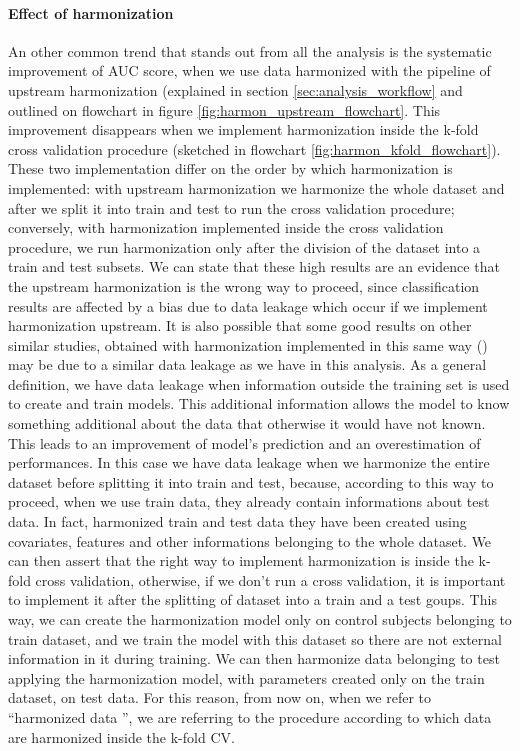 \documentclass[11pt]{report}
\begin{document}
\paragraph{Effect of harmonization}
An other common trend that stands out from all the analysis is the systematic improvement of AUC score, when we use data harmonized with the pipeline of upstream harmonization (explained in section \ref{sec:analysis_workflow} and outlined on flowchart in figure \ref{fig:harmon_upstream_flowchart}.
This improvement disappears when we implement harmonization inside the k-fold cross validation procedure (sketched in flowchart \ref{fig:harmon_kfold_flowchart}).
These two implementation differ on the order by which harmonization is implemented: with upstream harmonization we harmonize the whole dataset and after we split it into train and test to run the cross validation procedure; conversely, with harmonization implemented inside the cross validation procedure, we run harmonization only after the division of the dataset into a train and test subsets.
We can state that these high results are an evidence that the upstream harmonization is the wrong way to proceed, since classification results are affected by a bias due to data leakage which occur if we implement harmonization upstream.
It is also possible that some good results on other similar studies, obtained with harmonization implemented in this same way (\cite{ingalhalikar-2021}) may be due to a similar data leakage as we have in this analysis.
As a general definition, we have data leakage when information outside the training set is used to create and train models. This additional information allows the model to know something additional about the data that otherwise it would have not known.
This leads to an improvement of model's prediction and an overestimation of performances.
In this case we have data leakage when we harmonize the entire dataset before splitting it into train and test, because, according to this way to proceed, when we use train data, they already contain informations about test data.
In fact, harmonized train and test data they have been created using covariates, features and other informations belonging to the whole dataset.
We can then assert that the right way to implement harmonization is inside the k-fold cross validation, otherwise, if we don't run a cross validation, it is important to implement it after the splitting of dataset into a train and a test goups. This way, we can create the harmonization model only on control subjects belonging to train dataset, and we train the model with this dataset so there are not external information in it during training.
We can then harmonize data belonging to test applying the harmonization model, with parameters created only on the train dataset, on test data.
For this reason, from now on, when we refer to \textquotedblleft harmonized data \textquotedblright, we are referring to the procedure according to which data are harmonized inside the k-fold CV.
\end{document}
